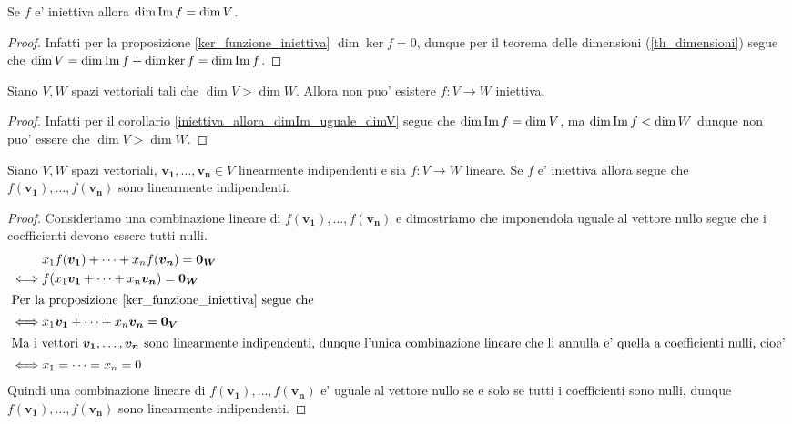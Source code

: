 \begin{corollary}\label{iniettiva_allora_dimIm_uguale_dimV}
    Se $f$ e' iniettiva allora $\dim \operatorname{Im}f = \dim V$.
\end{corollary}
\begin{proof}
    Infatti per la proposizione \ref{ker_funzione_iniettiva} $\dim \ker f = 0$, dunque per il teorema delle dimensioni (\ref{th_dimensioni}) segue che $\dim V = \dim \operatorname{Im}f + \dim \ker f = \dim \operatorname{Im}f$.
\end{proof}

\begin{corollary}
    Siano $V, W$ spazi vettoriali tali che $\dim V > \dim W$. Allora non puo' esistere $f : V \to W$ iniettiva.
\end{corollary}
\begin{proof}
    Infatti per il corollario \ref{iniettiva_allora_dimIm_uguale_dimV} segue che $\dim \operatorname{Im}f = \dim V$, ma $\dim \operatorname{Im}f < \dim W$ dunque non puo' essere che $\dim V > \dim W$.
\end{proof}

\begin{proposition}\label{indipendenti_mappati_indipendenti}
    Siano $V, W$ spazi vettoriali, $\bm{v_1}, \dots, \bm{v_n} \in V$ linearmente indipendenti e sia $f : V \to W$ lineare. Se $f$ e' iniettiva allora segue che $f(\bm{v_1}), \dots, f(\bm{v_n})$ sono linearmente indipendenti. 
\end{proposition}
\begin{proof}
    Consideriamo una combinazione lineare di $f(\bm{v_1}), \dots, f(\bm{v_n})$ e dimostriamo che imponendola uguale al vettore nullo segue che i coefficienti devono essere tutti nulli.
    \begin{alignat*}
        {1}
        &x_1f(\bm{v_1}) + \dots + x_nf(\bm{v_n}) = \bm{0_W}\\
        \iff &f(x_1\bm{v_1} + \dots + x_n\bm{v_n}) = \bm{0_W}\\
        \intertext{Per la proposizione \ref{ker_funzione_iniettiva} segue che}
        \iff &x_1\bm{v_1} + \dots + x_n\bm{v_n} = \bm{0_V}\\
        \intertext{Ma i vettori $\bm{v_1}, \dots, \bm{v_n}$ sono linearmente indipendenti, dunque l'unica combinazione lineare che li annulla e' quella a coefficienti nulli, cioe'}
        \iff &x_1 = \dots = x_n = 0
    \end{alignat*}
    Quindi una combinazione lineare di $f(\bm{v_1}), \dots, f(\bm{v_n})$ e' uguale al vettore nullo se e solo se tutti i coefficienti sono nulli, dunque $f(\bm{v_1}), \dots, f(\bm{v_n})$ sono linearmente indipendenti.
\end{proof}

